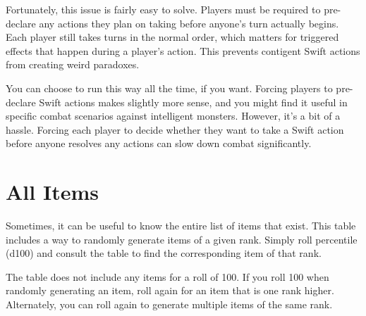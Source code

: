   Fortunately, this issue is fairly easy to solve.
  Players must be required to pre-declare any  actions they plan on taking before anyone's turn actually begins.
  Each player still takes turns in the normal order, which matters for triggered effects that happen during a player's action.
  This prevents contigent Swift actions from creating weird paradoxes.

  You can choose to run this way all the time, if you want.
  Forcing players to pre-declare Swift actions makes slightly more sense, and you might find it useful in specific combat scenarios against intelligent monsters.
  However, it's a bit of a hassle.
  Forcing each player to decide whether they want to take a Swift action before anyone resolves any actions can slow down combat significantly.

\section{All Items}

  Sometimes, it can be useful to know the entire list of items that exist.
  This table includes a way to randomly generate items of a given rank.
  Simply roll percentile (d100) and consult the table to find the corresponding item of that rank.

  The table does not include any items for a roll of 100.
  If you roll 100 when randomly generating an item, roll again for an item that is one rank higher.
  Alternately, you can roll again to generate multiple items of the same rank.

  \begin{longcolumn}
    
  \end{longcolumn}
